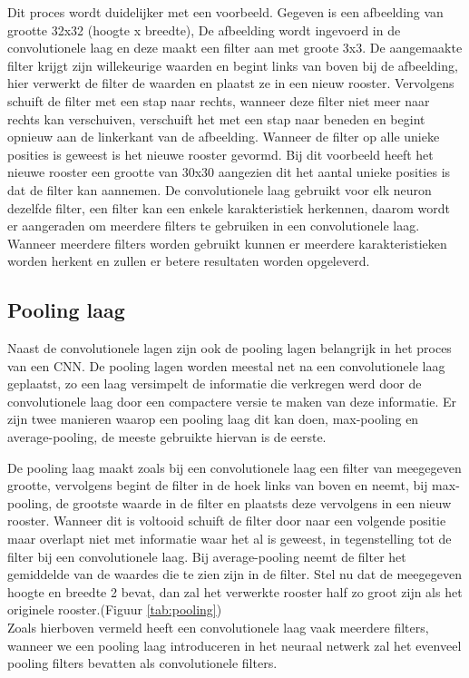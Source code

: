 Dit proces wordt duidelijker met een voorbeeld.
Gegeven is een afbeelding van grootte 32x32 (hoogte x breedte),
De afbeelding wordt ingevoerd in de convolutionele laag en deze maakt een filter aan met groote 3x3.
De aangemaakte filter krijgt zijn willekeurige waarden en begint links van boven bij de afbeelding, hier verwerkt de filter de waarden en plaatst ze in een nieuw rooster. 
Vervolgens schuift de filter met een stap naar rechts, wanneer deze filter niet meer naar rechts kan verschuiven, verschuift het met een stap naar beneden en begint opnieuw aan de linkerkant van de afbeelding.
Wanneer de filter op alle unieke posities is geweest is het nieuwe rooster gevormd. Bij dit voorbeeld heeft het nieuwe rooster een grootte van 30x30 aangezien dit het aantal unieke posities is dat de filter kan aannemen.
De convolutionele laag gebruikt voor elk neuron dezelfde filter, een filter kan een enkele karakteristiek herkennen, daarom wordt er aangeraden om meerdere filters te gebruiken in een convolutionele laag.
Wanneer meerdere filters worden gebruikt kunnen er meerdere karakteristieken worden herkent en zullen er betere resultaten worden opgeleverd.



\subsection{Pooling laag}

Naast de convolutionele lagen zijn ook de pooling lagen belangrijk in het proces van een CNN.
De pooling lagen worden meestal net na een convolutionele laag geplaatst, zo een laag versimpelt de informatie die verkregen werd door de convolutionele laag door een compactere versie te maken van deze informatie.
Er zijn twee manieren waarop een pooling laag dit kan doen, max-pooling en average-pooling, de meeste gebruikte hiervan is de eerste.

De pooling laag maakt zoals bij een convolutionele laag een filter van meegegeven grootte, vervolgens begint de filter in de hoek links van boven en neemt, bij max-pooling, de grootste waarde in de filter en plaatsts deze vervolgens in een nieuw rooster. Wanneer dit is voltooid schuift de filter door naar een volgende positie maar overlapt niet met informatie waar het al is geweest, in tegenstelling tot de filter bij een convolutionele laag.
Bij average-pooling neemt de filter het gemiddelde van de waardes die te zien zijn in de filter.
Stel nu dat de meegegeven hoogte en breedte 2 bevat, dan zal het verwerkte rooster half zo groot zijn als het originele rooster.(Figuur \ref{tab:pooling})\\
Zoals hierboven vermeld heeft een convolutionele laag vaak meerdere filters, wanneer we een pooling laag introduceren in het neuraal netwerk zal het evenveel pooling filters bevatten als convolutionele filters.

